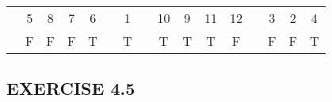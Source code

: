 \documentclass[a4paper,12pt]{article}
\begin{document}
\begin{enumerate}[label=\arabic*,leftmargin=*]
\begin{enumerate}[label=\arabic*.]
\begin{minipage}{\textwidth}
\begin{tabular}{c c c c c c c c c c c c c | c c c}
                        \hline
                          & 5 & 8  & 7  & 6 &   & 1 &   & 10& 9  & 11 & 12&   & 3 & 2    & 4\\
                          & F & F  & F  & T &   & T &   & T & T  & T  & F &   & F & F    & T\\
                    \end{tabular}
                    \vspace{1em}
                \end{minipage}
            \end{enumerate}
    \end{enumerate}

    \subsection*{EXERCISE 4.5}
\end{document}
